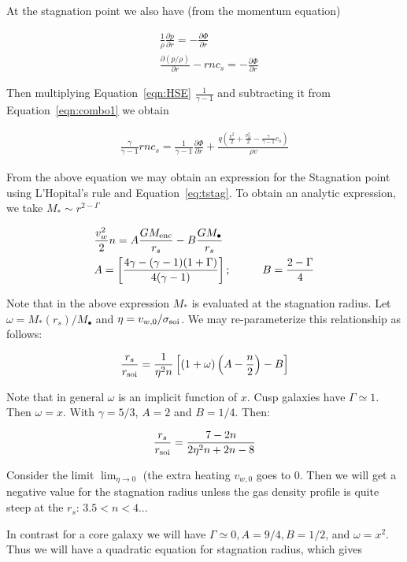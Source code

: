 \documentclass[usenatbib,fleqn]{mn2e}
\newcommand{\rs}{r_s}
\newcommand{\cs}{c_s}
\newcommand{\dxdy}[2]{\frac{\partial #1}{\partial #2} }
\newcommand{\ddr}[1]{\dxdy{#1}{r}}
\newcommand{\dpdr}{\dxdy{p}{r}}
\newcommand{\dphidr}{\dxdy{\Phi}{r}}
\newcommand{\ke}{\frac{v^2}{2}}
\newcommand{\kew}{\frac{v_w^2}{2}}
\newcommand{\gammaf}{\frac{\gamma}{\gamma-1}}
\newcommand{\cs}{\frac{p}{\rho}}
\newcommand{\Q}{q (\ke+\kew-\gammaf \cs)}
\newcommand{\Menc}{M_{\rm enc}}
\newcommand{\Mstar}{M_{*}}
\newcommand{\Mbh}[1][]{M_{\bullet#1}}
\newcommand{\phirs}{\frac{G \Menc}{\rs}}
\newcommand{\soi}{\rm soi}
\newcommand{\rsoi}{r_{\soi}}
\newcommand{\vwO}{v_{w,0}}
\newcommand{\x}{\frac{r_s}{\rsoi}}
\begin{document}
At the stagnation point we also have (from the momentum equation)

\begin{align}
&\frac{1}{\rho}\dpdr=-\dphidr\\
&\ddr{(p/\rho)}-r n \cs=-\dphidr \label{eqn:HSE}
\end{align}

Then multiplying Equation~\ref{eqn:HSE}  $\frac{1}{\gamma-1}$ and subtracting it from Equation~\ref{eqn:combo1} we obtain

\begin{align}
\gammaf r n \cs = \frac{1}{\gamma-1} \dphidr + \frac{\Q}{\rho  v}
\end{align}

From the above equation we may obtain an expression for the Stagnation point using L'Hopital's rule and Equation~\ref{eq:tstag}. To obtain an analytic expression, we take $\Mstar\sim r^{2-\Gamma}$

\begin{align}
&\kew n =A \phirs -B \frac{G \Mbh}{\rs}\\
&A=\left[\frac{4\gamma-(\gamma-1)(1+\Gamma)}{4(\gamma-1)}\right]; \hspace{1cm} B=\frac{2-\Gamma}{4} \label{eq:stag_analytic}
\end{align}

Note that in the above expression $\Mstar$ is evaluated at the stagnation radius. Let $\omega=\Mstar(\rs)/\Mbh$ and 
$\eta=v_{w,0}/\sigma_{\rm soi}$. We may re-parameterize this relationship as follows:

\begin{align}
\x=\frac{1}{\eta^2 n}\left[ (1+\omega)\left(A-\frac{n}{2}\right)-B\right]
\end{align}

Note that in general $\omega$ is an implicit function of $x$. Cusp galaxies have $\Gamma\simeq1$.  Then $\omega=x$. With $\gamma=5/3$, $A=2$ and $B=1/4$.  Then:

\begin{align}
\x=\frac{7-2n}{2\eta^2 n+2n-8}
\end{align}

Consider the limit $\lim_{\eta \to 0}$ (the extra heating $\vwO$ goes to 0. Then we will get a negative value for the stagnation radius unless the gas density profile is quite steep at the $\rs$: $3.5<n<4$...

In contrast for a core galaxy we will have $\Gamma\simeq0, A=9/4, B=1/2$, and  $\omega=x^2$. Thus we will have a quadratic equation for stagnation radius, which gives
\end{document}
